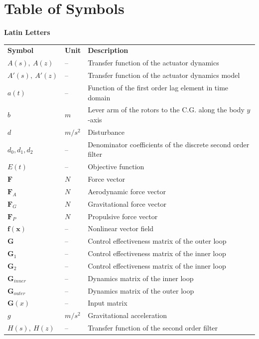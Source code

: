 \documentclass[11pt, a4paper, twoside]{report}
\begin{document}
\chapter*{Table of Symbols} \label{sec:table_of_symbols}

\textbf{Latin Letters}
\begin{table}[H]
  \begin{tabular}{p{2.5cm} p{1.5cm} p{10cm}} 
    \textbf{Symbol} & \textbf{Unit} & \textbf{Description} \\ [1.2ex] 
    $A(s),~A(z)$ & -- & Transfer function of the actuator dynamics \\ 
    $A'(s),~A'(z)$ & -- & Transfer function of the actuator dynamics model \\
    $a(t)$ & -- & Function of the first order lag element in time domain \\
    $b$ & $m$ & Lever arm of the rotors to the C.G. along the body $y$-axis \\
    $d$ & $m/s^2$ & Disturbance \\
    $d_0, d_1, d_2$ & -- & Denominator coefficients of the discrete second order filter \\
    $E(t)$ & -- & Objective function \\
    $\bm{F}$ & $N$ & Force vector \\
    $\bm{F}_A$ & $N$ & Aerodynamic force vector \\
    $\bm{F}_G$ & $N$ & Gravitational force vector \\
    $\bm{F}_P$ & $N$ & Propulsive force vector \\
    $\bm{f}(\bm{x})$ & -- & Nonlinear vector field \\
    $\bm{G}$ & -- & Control effectiveness matrix of the outer loop \\
    $\bm{G}_1$ & -- & Control effectiveness matrix of the inner loop \\
    $\bm{G}_2$ & -- & Control effectiveness matrix of the inner loop \\
    $\bm{G}_{inner}$ & -- & Dynamics matrix of the inner loop \\
    $\bm{G}_{outer}$ & -- & Dynamics matrix of the outer loop \\
    $\bm{G}(x)$ & -- & Input matrix \\
    $g$ & $m/s^2$ & Gravitational acceleration \\
    $H(s),~H(z)$ & -- & Transfer function of the second order filter \\

\end{tabular}
\end{table}
\end{document}

